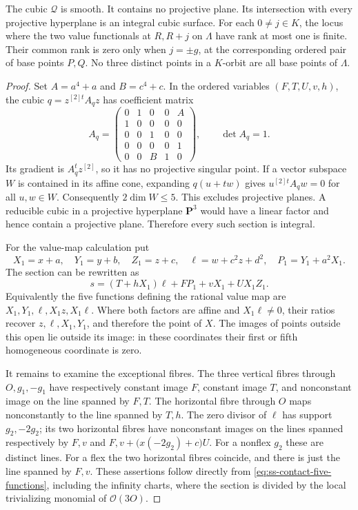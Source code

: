 \begin{lemma}
\label{lem:ss-contact-cubic-evaluation}
The cubic $\mathcal Q$ is smooth. It contains no projective plane.
Its intersection with every projective hyperplane is an integral
cubic surface. For each $0\ne j\in K$, the locus where the two value
functionals at $R,R+j$ on $\Lambda$ have rank at most one is finite.
Their common rank is zero only when $j=\pm g$, at the corresponding
ordered pair of base points $P,Q$. No three distinct points in a
$K$-orbit are all base points of $\Lambda$.
\end{lemma}
\begin{proof}
Set $A=a^4+a$ and $B=c^4+c$. In the ordered variables $(F,T,U,v,h)$,
the cubic $q=z^{[2]t}A_qz$ has coefficient matrix
\[
 A_q=\begin{pmatrix}
 0&1&0&0&A\\
 1&0&0&0&0\\
 0&0&1&0&0\\
 0&0&0&0&1\\
 0&0&B&1&0
 \end{pmatrix},\qquad \det A_q=1.
\]
Its gradient is $A_q^t z^{[2]}$, so it has no projective singular
point. If a vector subspace $W$ is contained in its affine cone,
expanding $q(u+t w)$ gives
$u^{[2]t}A_qw=0$ for all $u,w\in W$.
Consequently $2\dim W\le5$. This excludes projective planes.
A reducible cubic in a projective hyperplane $\mathbf P^3$ would
have a linear factor and hence contain a projective plane. Therefore
every such section is integral.

For the value-map calculation put
\[
 X_1=x+a,\quad Y_1=y+b,\quad Z_1=z+c,\quad
 \ell=w+c^2z+d^2,\quad P_1=Y_1+a^2X_1.
\]
The section can be rewritten as
\begin{equation}\label{eq:ss-contact-five-functions}
       s=(T+hX_1)\ell+FP_1+vX_1+UX_1Z_1.
\end{equation}
Equivalently the five functions defining the rational value map are
$X_1,Y_1,\ell,X_1z,X_1\ell$.
Where both factors are affine and $X_1\ell\ne0$, their ratios
recover $z,\ell,X_1,Y_1$, and therefore the point of $X$.
The images of points outside this open lie outside its image: in
these coordinates their first or fifth homogeneous coordinate is zero.

It remains to examine the exceptional fibres. The three vertical
fibres through $O,g_1,-g_1$ have respectively constant image $F$,
constant image $T$, and nonconstant image on the line spanned by
$F,T$. The horizontal fibre through $O$ maps nonconstantly to the
line spanned by $T,h$. The zero divisor of $\ell$ has support
$g_2,-2g_2$; its two horizontal fibres have nonconstant images on
the lines spanned respectively by $F,v$ and
$F,v+\bigl(x(-2g_2)+c\bigr)U$.
For a nonflex $g_2$ these are distinct lines. For a flex the two
horizontal fibres coincide, and there is just the line spanned by
$F,v$. These assertions follow directly from
\eqref{eq:ss-contact-five-functions}, including the infinity
charts, where the section is divided by the local trivializing
monomial of $\mathcal O(3O)$.


\end{proof}
